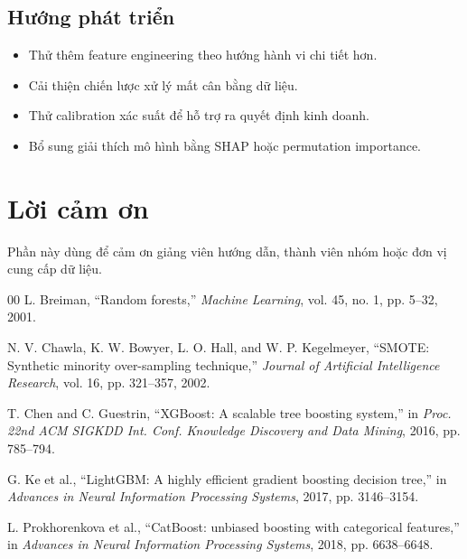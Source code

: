 \documentclass[conference]{IEEEtran}
\begin{document}
\subsection{Hướng phát triển}
\begin{itemize}
    \item Thử thêm feature engineering theo hướng hành vi chi tiết hơn.
    \item Cải thiện chiến lược xử lý mất cân bằng dữ liệu.
    \item Thử calibration xác suất để hỗ trợ ra quyết định kinh doanh.
    \item Bổ sung giải thích mô hình bằng SHAP hoặc permutation importance.
\end{itemize}

\section*{Lời cảm ơn}
Phần này dùng để cảm ơn giảng viên hướng dẫn, thành viên nhóm hoặc đơn vị cung cấp dữ liệu.

\begin{thebibliography}{00}
L. Breiman, ``Random forests,'' \textit{Machine Learning}, vol. 45, no. 1, pp. 5--32, 2001.

N. V. Chawla, K. W. Bowyer, L. O. Hall, and W. P. Kegelmeyer, ``SMOTE: Synthetic minority over-sampling technique,'' \textit{Journal of Artificial Intelligence Research}, vol. 16, pp. 321--357, 2002.

T. Chen and C. Guestrin, ``XGBoost: A scalable tree boosting system,'' in \textit{Proc. 22nd ACM SIGKDD Int. Conf. Knowledge Discovery and Data Mining}, 2016, pp. 785--794.

G. Ke et al., ``LightGBM: A highly efficient gradient boosting decision tree,'' in \textit{Advances in Neural Information Processing Systems}, 2017, pp. 3146--3154.

L. Prokhorenkova et al., ``CatBoost: unbiased boosting with categorical features,'' in \textit{Advances in Neural Information Processing Systems}, 2018, pp. 6638--6648.
\end{thebibliography}
\end{document}
